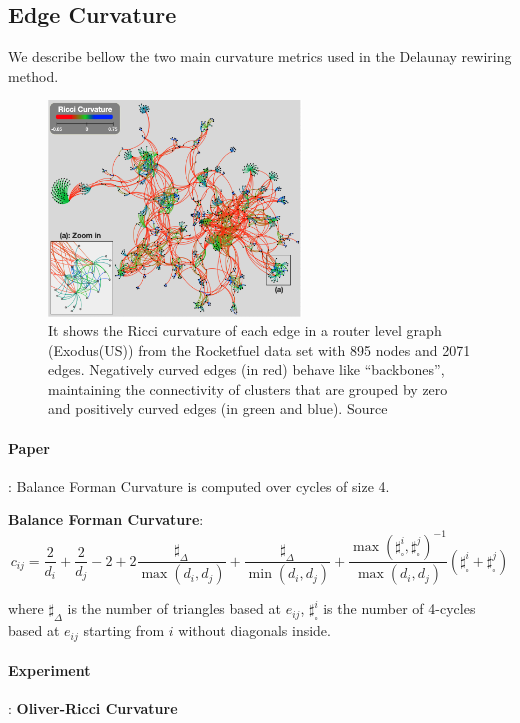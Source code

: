\documentclass{article}
\theoremstyle{plain}
\theoremstyle{definition}
\theoremstyle{remark}
\begin{document}
\subsection{Edge Curvature}
\label{app:curvature}
We describe bellow the two main curvature metrics used in the Delaunay rewiring method.
\begin{figure}[ht!]
    \center
    \includegraphics[width=0.6\textwidth]{figures/Riccicurvature.png}
    \caption{ It shows the Ricci curvature of each edge in a router level graph
    (Exodus(US)) from the Rocketfuel data set with 895 nodes and 2071
    edges. Negatively curved edges (in red) behave like “backbones”,
    maintaining the connectivity of clusters that are grouped by zero and
    positively curved edges (in green and blue). Source \cite{ni2015riccicurvatureinternettopology}}
    \label{fig:ricci_edge_curvature}
\end{figure}

\paragraph{Paper}: 
Balance Forman Curvature \cite{topping2022understandingoversquashingbottlenecksgraphs} 
is computed over cycles of size 4.
    
\textbf{Balance Forman Curvature}:
    $$c_{ij}= \frac{2}{d_i} + \frac{2}{d_j} - 2 + 2 \frac{\sharp_{\Delta}}{\max(d_i, d_j)} + 
            \frac{\sharp_{\Delta}}{\min(d_i, d_j)} + 
            \frac{\max(\sharp_{\square}^i,\sharp_{\square}^j)^{-1}}{\max(d_i, d_j)}
            (\sharp_{\square}^i + \sharp_{\square}^j)
    $$

    where $\sharp_{\Delta}$ is the number of triangles based at $e_{ij}$, 
    $\sharp_{\square}^i$ is the number of 4-cycles based at $e_{ij}$ starting from $i$
    without diagonals inside.


\paragraph{Experiment}: 
\textbf{Oliver-Ricci Curvature} \cite{ni2015riccicurvatureinternettopology} 
\end{document}
